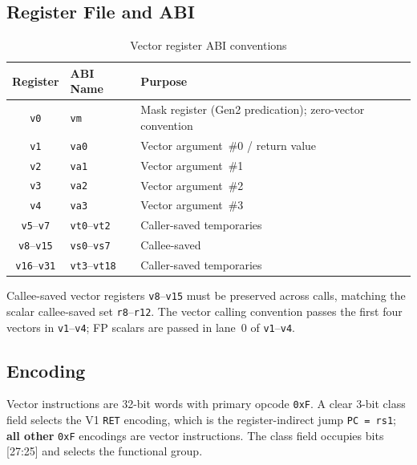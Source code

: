 \documentclass[11pt,a4paper]{article}
\begin{document}
\subsection{Register File and ABI}

\begin{table}[H]
\centering
\caption{Vector register ABI conventions}
\begin{tabular}{cll}
\toprule
Register & ABI Name & Purpose \\
\midrule
{\tt v0}   & {\tt vm} & Mask register (Gen2 predication); zero-vector convention \\
{\tt v1}   & {\tt va0} & Vector argument~\#0 / return value \\
{\tt v2}   & {\tt va1} & Vector argument~\#1 \\
{\tt v3}   & {\tt va2} & Vector argument~\#2 \\
{\tt v4}   & {\tt va3} & Vector argument~\#3 \\
{\tt v5}--{\tt v7} & {\tt vt0}--{\tt vt2} & Caller-saved temporaries \\
{\tt v8}--{\tt v15} & {\tt vs0}--{\tt vs7} & Callee-saved \\
{\tt v16}--{\tt v31} & {\tt vt3}--{\tt vt18} & Caller-saved temporaries \\
\bottomrule
\end{tabular}
\end{table}

Callee-saved vector registers {\tt v8}--{\tt v15} must be preserved across
calls, matching the scalar callee-saved set {\tt r8}--{\tt r12}. The vector
calling convention passes the first four vectors in {\tt v1}--{\tt v4}; FP
scalars are passed in lane~0 of {\tt v1}--{\tt v4}.

\subsection{Encoding}

Vector instructions are 32-bit words with primary opcode {\tt 0xF}. A clear
3-bit class field selects the V1 {\tt RET} encoding, which is the
register-indirect jump {\tt PC = rs1}; \textbf{all other} {\tt 0xF} encodings
are vector instructions. The class field occupies bits [27:25] and selects the
functional group.
\end{document}
